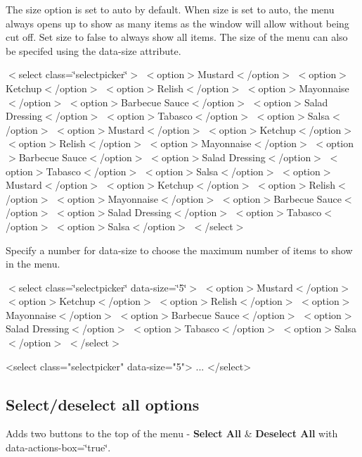 The {\ttfamily size} option is set to {\ttfamily \textquotesingle{}auto\textquotesingle{}} by default. When {\ttfamily size} is set to {\ttfamily \textquotesingle{}auto\textquotesingle{}}, the menu always opens up to show as many items as the window will allow without being cut off. Set {\ttfamily size} to {\ttfamily false} to always show all items. The size of the menu can also be specifed using the {\ttfamily data-\/size} attribute.

 $<$select class=\char`\"{}selectpicker\char`\"{}$>$ $<$option$>$Mustard$<$/option$>$ $<$option$>$Ketchup$<$/option$>$ $<$option$>$Relish$<$/option$>$ $<$option$>$Mayonnaise$<$/option$>$ $<$option$>$Barbecue Sauce$<$/option$>$ $<$option$>$Salad Dressing$<$/option$>$ $<$option$>$Tabasco$<$/option$>$ $<$option$>$Salsa$<$/option$>$ $<$option$>$Mustard$<$/option$>$ $<$option$>$Ketchup$<$/option$>$ $<$option$>$Relish$<$/option$>$ $<$option$>$Mayonnaise$<$/option$>$ $<$option$>$Barbecue Sauce$<$/option$>$ $<$option$>$Salad Dressing$<$/option$>$ $<$option$>$Tabasco$<$/option$>$ $<$option$>$Salsa$<$/option$>$ $<$option$>$Mustard$<$/option$>$ $<$option$>$Ketchup$<$/option$>$ $<$option$>$Relish$<$/option$>$ $<$option$>$Mayonnaise$<$/option$>$ $<$option$>$Barbecue Sauce$<$/option$>$ $<$option$>$Salad Dressing$<$/option$>$ $<$option$>$Tabasco$<$/option$>$ $<$option$>$Salsa$<$/option$>$ $<$/select$>$ 

Specify a number for {\ttfamily data-\/size} to choose the maximum number of items to show in the menu.

 $<$select class=\char`\"{}selectpicker\char`\"{} data-\/size=\char`\"{}5\char`\"{}$>$ $<$option$>$Mustard$<$/option$>$ $<$option$>$Ketchup$<$/option$>$ $<$option$>$Relish$<$/option$>$ $<$option$>$Mayonnaise$<$/option$>$ $<$option$>$Barbecue Sauce$<$/option$>$ $<$option$>$Salad Dressing$<$/option$>$ $<$option$>$Tabasco$<$/option$>$ $<$option$>$Salsa$<$/option$>$ $<$/select$>$ 


\begin{DoxyCode}
<select class="selectpicker" data-size="5">
  ...
</select>
\end{DoxyCode}


\subsection*{Select/deselect all options}

Adds two buttons to the top of the menu -\/ {\bfseries Select All} \& {\bfseries Deselect All} with {\ttfamily data-\/actions-\/box=\char`\"{}true\char`\"{}}.

